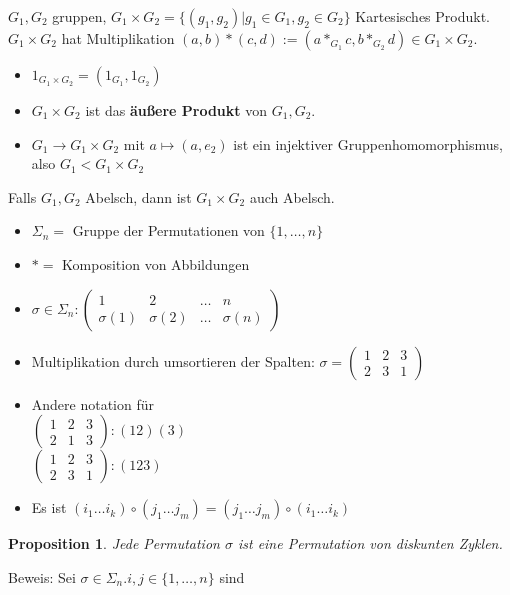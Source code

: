 \documentclass{article}
\newtheorem{proposition}[thm]{Proposition}
\begin{document}
$G_1,G_2$ gruppen, $G_1\times G_2=\{(g_1,g_2)|g_1\in G_1,
g_2\in G_2\}$ Kartesisches Produkt.
$G_1\times G_2$ hat Multiplikation $(a,b)*(c,d):=
(a*_{G_1}c,b*_{G_2}d)\in G_1\times G_2$.
\begin{itemize}
    \item $1_{G_1\times G_2}=(1_{G_1},1_{G_2})$
    \item $G_1\times G_2$ ist das \textbf{äußere Produkt}
        von $G_1,G_2$.
    \item $G_1\to G_1\times G_2$ mit $a\mapsto (a,e_2)$
        ist ein injektiver Gruppenhomomorphismus, also
        $G_1<G_1\times G_2$
\end{itemize}
Falls $G_1,G_2$ Abelsch, dann ist $G_1\times G_2$ auch
Abelsch.
\begin{itemize}
    \item $\Sigma_n=$ Gruppe der Permutationen von
        $\{1,\hdots,n\}$
    \item $*=$ Komposition von Abbildungen
    \item $\sigma\in\Sigma_n:
        \begin{pmatrix}
            1&2&\hdots&n\\
            \sigma(1)&\sigma(2)&\hdots&\sigma(n)
        \end{pmatrix}$
    \item Multiplikation durch umsortieren der Spalten:
        $\sigma=
        \begin{pmatrix}
            1&2&3\\
            2&3&1
        \end{pmatrix}$
    \item Andere notation für\\
        $\begin{pmatrix}1&2&3\\2&1&3\end{pmatrix}:(12)(3)$\\
        $\begin{pmatrix}1&2&3\\2&3&1\end{pmatrix}:(123)$
    \item Es ist
        $(i_1\hdots i_k)\circ(j_1\hdots j_m)=
        (j_1\hdots j_m)\circ(i_1\hdots i_k)$
\end{itemize}
\begin{proposition}
    Jede Permutation $\sigma$ ist eine Permutation von
    diskunten Zyklen.
\end{proposition}
Beweis: Sei $\sigma\in\Sigma_n.i,j\in\{1,\hdots,n\}$ sind
\end{document}
